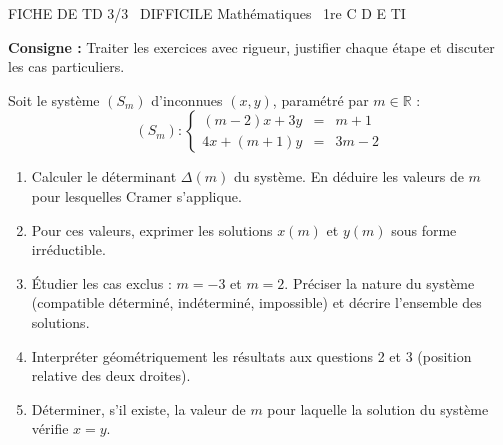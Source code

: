 \documentclass[11pt]{article}
\begin{document}
\begin{tcolorbox}[enhanced,colback=popink,colframe=popink,arc=10pt,boxrule=0pt,left=12pt,right=12pt,top=9pt,bottom=9pt]
{\color{white}\popxbold\small FICHE DE TD 3/3 \textbullet\ DIFFICILE \hfill Mathématiques \textbullet\ 1re C D E TI\par}
\end{tcolorbox}
\vspace{4pt}
\noindent \textbf{Consigne :} Traiter les exercices avec rigueur, justifier chaque étape et discuter les cas particuliers.

\begin{exercice}
Soit le système $(S_m)$ d'inconnues $(x,y)$, paramétré par $m \in \mathbb{R}$ :
\[
(S_m) : \left\{
\begin{array}{rcl}
(m-2)x + 3y &=& m+1 \\
4x + (m+1)y &=& 3m-2
\end{array}
\right.
\]
\begin{enumerate}
    \item Calculer le déterminant $\Delta(m)$ du système. En déduire les valeurs de $m$ pour lesquelles Cramer s'applique.
    \item Pour ces valeurs, exprimer les solutions $x(m)$ et $y(m)$ sous forme irréductible.
    \item Étudier les cas exclus : $m = -3$ et $m = 2$. Préciser la nature du système (compatible déterminé, indéterminé, impossible) et décrire l'ensemble des solutions.
    \item Interpréter géométriquement les résultats aux questions 2 et 3 (position relative des deux droites).
    \item Déterminer, s'il existe, la valeur de $m$ pour laquelle la solution du système vérifie $x = y$.
\end{enumerate}
\end{exercice}
\end{document}
